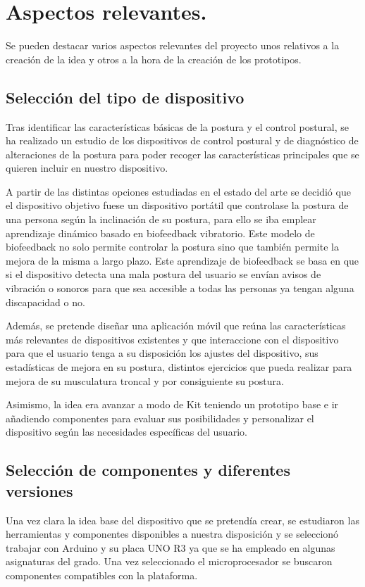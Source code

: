 \section{Aspectos relevantes.}

Se pueden destacar varios aspectos relevantes del proyecto unos relativos a la creación de la idea y otros a la hora de la creación de los prototipos.

\subsection{Selección del tipo de dispositivo}
Tras identificar las características básicas de la postura y el control postural, se ha realizado un estudio de los dispositivos de control postural y de diagnóstico de alteraciones de la postura para poder recoger las características principales que se quieren incluir en nuestro dispositivo. 

A partir de las distintas opciones estudiadas en el estado del arte se decidió que el dispositivo objetivo fuese un dispositivo portátil que controlase la postura de una persona según la inclinación de su postura, para ello se iba emplear aprendizaje dinámico basado en biofeedback vibratorio. Este modelo de biofeedback no solo permite controlar la postura sino que también permite la mejora de la misma a largo plazo. Este aprendizaje de biofeedback se basa en que si el dispositivo detecta una mala postura del usuario se envían avisos de vibración o sonoros para que sea accesible a todas las personas ya tengan alguna discapacidad o no. 

Además, se pretende diseñar una aplicación móvil que reúna las características más relevantes de dispositivos existentes y que interaccione con el dispositivo para que el usuario tenga a su disposición los ajustes del dispositivo, sus estadísticas de mejora en su postura, distintos ejercicios que pueda realizar para mejora de su musculatura troncal y por consiguiente su postura.

Asimismo, la idea era avanzar a modo de Kit teniendo un prototipo base e ir añadiendo componentes para evaluar sus posibilidades y personalizar el dispositivo según las necesidades específicas del usuario.

\subsection{Selección de componentes y diferentes versiones}
Una vez clara la idea base del dispositivo que se pretendía crear, se estudiaron las herramientas y componentes disponibles a nuestra disposición y se seleccionó trabajar con Arduino y su placa UNO R3 ya que se ha empleado en algunas asignaturas del grado. Una vez seleccionado el microprocesador se buscaron componentes compatibles con la plataforma.

